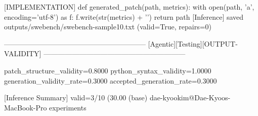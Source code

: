 [IMPLEMENTATION]
def generated_patch(path, metrics):
with open(path, 'a', encoding='utf-8') as f:
f.write(str(metrics) + '\n')
return path
[Inference] saved outputs/swebench/swebench-sample10.txt (valid=True, repairs=0)

------------------------------------------------------------
[Agentic][Testing][OUTPUT-VALIDITY]
------------------------------------------------------------

patch_structure_validity=0.8000
python_syntax_validity=1.0000
generation_validity_rate=0.3000
accepted_generation_rate=0.3000

[Inference Summary] valid=3/10 (30.00%
(base) dae-kyookim@Dae-Kyoos-MacBook-Pro experiments %